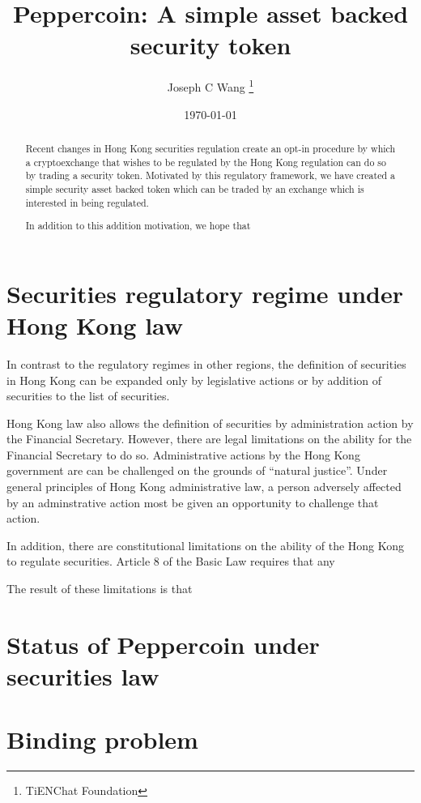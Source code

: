 \documentclass[journal]{IEEEtran}
\begin{document}
\title{Peppercoin: A simple asset backed security token}
\author{Joseph C Wang \thanks{TiENChat Foundation}}
\date{\today}
 

 
\maketitle

\begin{abstract}
Recent changes in Hong Kong securities regulation create an opt-in
procedure by which a cryptoexchange that wishes to be regulated by the
Hong Kong regulation can do so by trading a security token.  Motivated
by this regulatory framework, we have created a simple security asset
backed token which can be traded by an exchange which is interested in
being regulated.

In addition to this addition motivation, we hope that 
\end{abstract}

\section{Securities regulatory regime under Hong Kong law}

In contrast to the regulatory regimes in other regions, the definition
of securities in Hong Kong can be expanded only by legislative actions
or by addition of securities to the list of securities.

Hong Kong law also allows the definition of securities by
administration action by the Financial Secretary.  However, there are
legal limitations on the ability for the Financial Secretary to do
so.  Administrative actions by the Hong Kong government are can be
challenged on the grounds of ``natural justice''.  Under general
principles of Hong Kong administrative law, a person adversely
affected by an adminstrative action most be given an opportunity to
challenge that action.

In addition, there are constitutional limitations on the ability of
the Hong Kong to regulate securities.  Article 8 of the Basic Law
requires that any

The result of these limitations is that 

\section{Status of Peppercoin under securities law}

\section{Binding problem}
\end{document}
